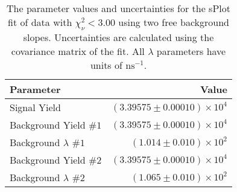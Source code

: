 
\begin{table}[ht]
    \begin{center}
        \begin{tabular}{lr}\toprule
            Parameter & Value \\\midrule
            Signal Yield & $(3.39575 \pm 0.00010) \times 10^{4}$ \\
            Background Yield $\#1$ & $(3.39575 \pm 0.00010) \times 10^{4}$ \\
            Background $\lambda$ $\#1$ & $(1.014 \pm 0.010) \times 10^{2}$ \\
            Background Yield $\#2$ & $(3.39575 \pm 0.00010) \times 10^{4}$ \\
            Background $\lambda$ $\#2$ & $(1.065 \pm 0.010) \times 10^{2}$ \\\bottomrule
        \end{tabular}
        \caption{The parameter values and uncertainties for the sPlot fit of data with $\chi^2_\nu < 3.00$ using two free background slopes. Uncertainties are calculated using the covariance matrix of the fit. All $\lambda$ parameters have units of $\si{\nano\second}^{-1}$.}\label{tab:splot-fit-results-chisqdof-3.00-free-2}
    \end{center}
\end{table}
